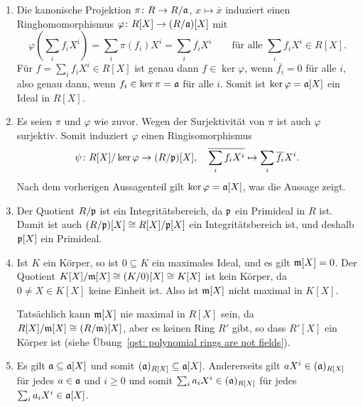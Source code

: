 \begin{solution}
  \begin{enumerate}
    \item
      Die kanonische Projektion $\pi \colon R \to R/\mathfrak{a}$, $x \mapsto \overline{x}$ induziert einen Ringhomomorphismus $\varphi \colon R[X] \to (R/\mathfrak{a})[X]$ mit
      \[
          \varphi\left( \sum_i f_i X^i \right)
        = \sum_i \pi(f_i) X^i
        = \sum_i \overline{f_i} X^i
        \qquad
        \text{für alle $\sum_i f_i X^i \in R[X]$}.
      \]
      Für $f = \sum_i f_i X^i \in R[X]$ ist genau dann $f \in \ker \varphi$, wenn $\overline{f_i} = 0$ für alle $i$, also genau dann, wenn $f_i \in \ker \pi = \mathfrak{a}$ für alle $i$.
      Somit ist $\ker \varphi = \mathfrak{a}[X]$ ein Ideal in $R[X]$.
      
    \item
      Es seien $\pi$ und $\varphi$ wie zuvor.
      Wegen der Surjektivität von $\pi$ ist auch $\varphi$ surjektiv.
      Somit induziert $\varphi$ einen Ringisomorphismus
      \[
        \psi \colon R[X] / \ker \varphi \to (R/\mathfrak{p})[X],
        \quad
        \overline{\sum_i f_i X^i} \mapsto \sum_i \overline{f_i} X^i.
      \]
      Nach dem vorherigen Aussagenteil gilt $\ker \varphi = \mathfrak{a}[X]$, was die Aussage zeigt.
      
    \item
      Der Quotient $R/\mathfrak{p}$ ist ein Integritätsbereich, da $\mathfrak{p}$ ein Primideal in $R$ ist.
      Damit ist auch $(R/\mathfrak{p})[X] \cong R[X]/\mathfrak{p}[X]$ ein Integritätsbereich ist, und deshalb $\mathfrak{p}[X]$ ein Primideal.
      
    \item
      Ist $K$ ein Körper, so ist $0 \subseteq K$ ein maximales Ideal, und es gilt $\mathfrak{m}[X] = 0$.
      Der Quotient $K[X]/\mathfrak{m}[X] \cong (K/0)[X] \cong K[X]$ ist kein Körper, da $0 \neq X \in K[X]$ keine Einheit ist.
      Also ist $\mathfrak{m}[X]$ nicht maximal in $K[X]$.
      
      Tatsächlich kann $\mathfrak{m}[X]$ nie maximal in $R[X]$ sein, da $R[X]/\mathfrak{m}[X] \cong (R/\mathfrak{m})[X]$, aber es keinen Ring $R'$ gibt, so dass $R'[X]$ ein Körper ist (siehe Übung~\ref{qst: polynomial rings are not fields}).
      
    \item
      Es gilt $\mathfrak{a} \subseteq \mathfrak{a}[X]$ und somit $(\mathfrak{a})_{R[X]} \subseteq \mathfrak{a}[X]$.
      Andererseits gilt $a X^i \in (\mathfrak{a})_{R[X]}$ für jedes $a \in \mathfrak{a}$ und $i \geq 0$ und somit $\sum_i a_i X^i \in (\mathfrak{a})_{R[X]}$ für jedes $\sum_i a_i X^i \in \mathfrak{a}[X]$.
      

\end{enumerate}
\end{solution}
